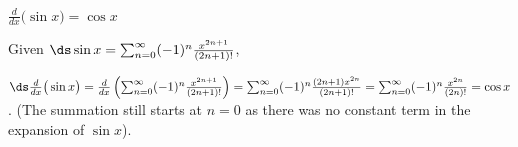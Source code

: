 {$\frac{d}{dx}\big(\sin x\big) = \cos x$
}
{Given $\ds \sin x = \sum_{n=0}^\infty (-1)^n\frac{x^{2n+1}}{(2n+1)!}$,

$\ds\frac{d}{dx}\big(\sin x\big)  = \frac{d}{dx}\left(\sum_{n=0}^\infty (-1)^n\frac{x^{2n+1}}{(2n+1)!}\right)=\sum_{n=0}^\infty (-1)^n\frac{(2n+1)x^{2n}}{(2n+1)!}=\sum_{n=0}^\infty (-1)^n\frac{x^{2n}}{(2n)!}=\cos x$. (The summation still starts at $n=0$ as there was no constant term in the expansion of $\sin x$).
}